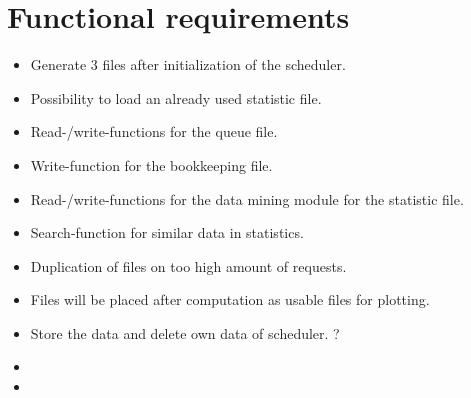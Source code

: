 {


\setcounter{func}{10}
\renewcommand{\labelitemi}{
	\ifnum \value{func}<10$/F 0\arabic{func} /$\addtocounter{func}{10}
	\else $/F \arabic{func} /$\addtocounter{func}{10}\fi
	}

\section{Functional requirements} 
	\begin{itemize}
		\item Generate 3 files after initialization of the scheduler.
		\item Possibility to load an already used statistic file.
		\item Read-/write-functions for the queue file.
		\item Write-function for the bookkeeping file.
		\item Read-/write-functions for the data mining module for the statistic file.
		\item Search-function for similar data in statistics.
		\item Duplication of files on too high amount of requests.
		\item Files will be placed after computation as usable files for plotting.
		\item Store the data and delete own data of scheduler. ?
		\item
		\item 
	\end{itemize}
}